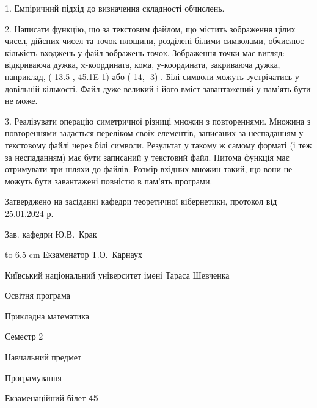 \documentclass[12pt, ukrainian]{article}
\begin{document}
{%
1. Емпіричний підхід до визначення складності обчислень.%
\par
2. Написати функцію, що за текстовим файлом, що містить зображення цілих чисел, дійсних чисел та точок площини, розділені білими символами, обчислює кількість входжень у файл зображень точок. Зображення точки має вигляд: відкриваюча дужка, x-координата, кома, y-координата, закриваюча дужка, наприклад, ( 13.5 , 45.1E-1) або ( 14, -3) . Білі символи можуть зустрічатись у довільній кількості. Файл дуже великий і його вміст завантажений у пам'ять бути не може.

\par
3. Реалізувати операцію симетричної різниці множин з повтореннями. Множина з повтореннями задається переліком своїх елементів, записаних за неспаданням у текстовому файлі через білі символи. Результат у такому ж самому форматі (і теж за неспаданням) має бути записаний у текстовий файл. Питома функція має отримувати три шляхи до файлів. Розмір вхідних множин такий, що вони не можуть бути завантажені повністю в пам’ять програми.

}
{\smallskip\smallskip \begin {scriptsize} Затверджено на засіданні кафедри теоретичної кібернетики, протокол   від   25.01.2024 р.\par\smallskip\smallskip\smallskip\smallskip
{\parbox {6.5 cm} {Зав. кафедри \dotfill Ю.В.~Крак}}\hspace {0.7cm} {\hbox to 6.5 cm { Екзаменатор \dotfill Т.О.~Карнаух}} \end{scriptsize}}
\vspace{0.9cm}
{{\begin {scriptsize}\par
{ \center  Київський національний університет імені Тараса Шевченка \par}
{\parbox {5 cm}{Освітня програма \hfill}{\parbox {7 cm}{Прикладна математика\hfill}}\parbox {6 cm}{\hfill Семестр 2}}\par
{\parbox {5 cm} {Навчальний предмет \hfill}\parbox {7 cm}{Програмування \hfill}\parbox {6cm}{\hfill}\par}\vspace{-15pt} \end{scriptsize}}{\center Екзаменаційний білет \No \textbf { 45 }\par}}
\end{document}
